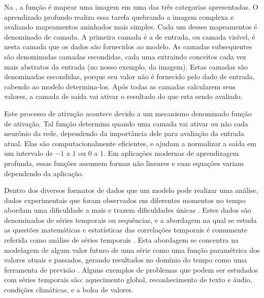 %

Na , a função é mapear uma imagem em uma das três categorias apresentadas. O aprendizado profundo realiza essa tarefa quebrando a imagem complexa e avaliando mapeamentos aninhados mais simples. Cada um desses mapeamentos é denominado de camada. A primeira camada é a de entrada, ou camada visível, é nesta camada que os dados são fornecidos ao modelo. As camadas subsequentes são denominadas camadas escondidas, cada uma extraindo conceitos cada vez mais abstratos da entrada (no nosso exemplo, da imagem). Estas camadas são denominadas escondidas, porque seu valor não é fornecido pelo dado de entrada, cabendo ao modelo determina-los. Após todas as camadas calcularem seus valores, a camada de saída vai ativar o resultado do que esta sendo avaliado. 

Este processo de ativação acontece devido a um mecanismo denominado função de ativação. Tal função determina quando uma camada vai ativar ou não cada neurônio da rede, dependendo da importância dele para avaliação da entrada atual. Elas são computacionalmente eficientes, e ajudam a normalizar a saída em um intervalo de $-1$ a $1$ ou $0$ a $1$. Em aplicações modernas de aprendizagem profunda, essas funções assumem formas não lineares e suas equações variam dependendo da aplicação. 

Dentro dos diversos formatos de dados que um modelo pode realizar uma análise, dados experimentais que foram observados em diferentes momentos no tempo abordam uma dificuldade a mais e trazem dificuldades únicas \cite{shumway2017time}. Estes dados são denominados de séries temporais ou sequências, e a abordagem na qual se estuda as questões matemáticas e estatísticas das correlações temporais é comumente referida como análise de séries temporais \cite{shumway2017time}. Esta abordagem se concentra na modelagem de algum valor futuro de uma série como uma função paramétrica dos valores atuais e passados, gerando resultados no domínio do tempo como uma ferramenta de previsão \cite{shumway2017time}. Alguns exemplos de problemas que podem ser estudados com séries temporais são: aquecimento global, reconhecimento de texto e áudio, condições climáticas, e a bolsa de valores. 

